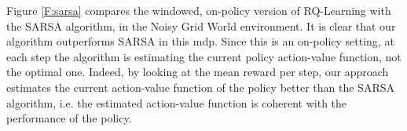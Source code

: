 Figure \ref{F:sarsa} compares the windowed, on-policy version of RQ-Learning with the SARSA algorithm, in the Noisy Grid World environment. It is clear that our algorithm outperforms SARSA in this \gls{mdp}.
Since this is an on-policy setting, at each step the algorithm is estimating the current policy action-value function, not the optimal one. Indeed, by looking at the mean reward per step, our approach estimates the current action-value function of the policy better than the SARSA algorithm, i.e. the estimated action-value function is coherent with the performance of the policy.
